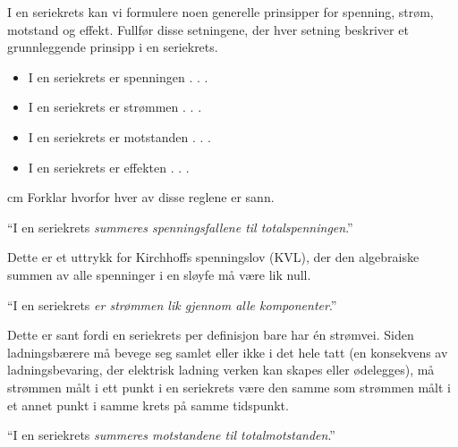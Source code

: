 

I en seriekrets kan vi formulere noen generelle prinsipper for spenning, strøm, motstand og effekt. Fullfør disse setningene, der hver setning beskriver et grunnleggende prinsipp i en seriekrets.

\vskip 10pt


\begin{itemize}
\item I en seriekrets er spenningen . . .
\item I en seriekrets er strømmen . . .
\item I en seriekrets er motstanden . . .
\item I en seriekrets er effekten . . .

\end{itemize}
 cm
Forklar hvorfor hver av disse reglene er sann.







\noindent
``I en seriekrets {\it summeres spenningsfallene til totalspenningen}.''

\vskip 10pt

Dette er et uttrykk for Kirchhoffs spenningslov (KVL), der den algebraiske summen av alle spenninger i en sløyfe må være lik null.




\vskip 30pt

\noindent
``I en seriekrets {\it er strømmen lik gjennom alle komponenter}.''

\vskip 10pt

Dette er sant fordi en seriekrets per definisjon bare har én strømvei.  Siden ladningsbærere må bevege seg samlet eller ikke i det hele tatt (en konsekvens av ladningsbevaring, der elektrisk ladning verken kan skapes eller ødelegges), må strømmen målt i ett punkt i en seriekrets være den samme som strømmen målt i et annet punkt i samme krets på samme tidspunkt.



\vskip 30pt

\noindent
``I en seriekrets {\it summeres motstandene til totalmotstanden}.''

\vskip 10pt

